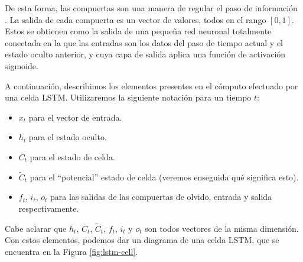 \documentclass[../../main.tex]{subfiles}
\begin{document}
De esta forma, las compuertas son una manera de regular el paso de información
\cite{colahs-blog-lstm-2015}. La salida de cada compuerta es un vector de valores, todos en
el rango \([0,1]\). Estos se obtienen como la salida de una pequeña red neuronal
totalmente conectada en la que las entradas son los datos del paso de tiempo actual y el
estado oculto anterior, y cuya capa de salida aplica una función de activación sigmoide.

A continuación, describimos los elementos presentes en el cómputo efectuado por una celda
LSTM. Utilizaremos la siguiente notación para un tiempo \(t\):
\begin{itemize}[itemsep=0.1cm]
    \item \(x_t\) para el vector de entrada.
    \item \(h_t\) para el estado oculto.
    \item \(C_t\) para el estado de celda.
    \item \(\tilde{C}_t\) para el ``potencial'' estado de celda (veremos enseguida qué
    significa esto).
    \item \(f_t\), \(i_t\), \(o_t\) para las salidas de las compuertas de olvido,
    entrada y salida respectivamente.
\end{itemize}
Cabe aclarar que \(h_t\), \(C_t\), \(\tilde{C}_t\), \(f_t\), \(i_t\) y \(o_t\) son todos
vectores de la misma dimensión. Con estos elementos, podemos dar un diagrama de una celda
LSTM, que se encuentra en la Figura \ref{fig:lstm-cell}.
\end{document}
